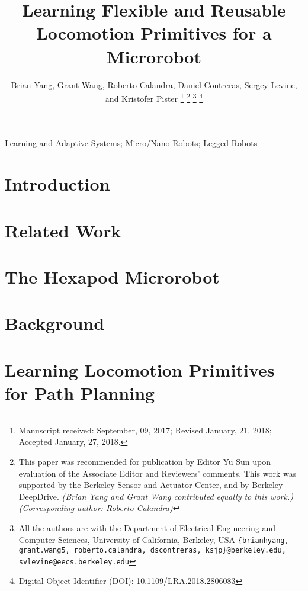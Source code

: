 \documentclass[letterpaper, 10 pt, journal, twoside]{IEEEtran}
\title{Learning Flexible and Reusable Locomotion Primitives for a Microrobot}
\author{Brian Yang, Grant Wang, Roberto Calandra, Daniel Contreras, Sergey Levine, and Kristofer Pister%
\thanks{Manuscript received: September, 09, 2017; Revised January, 21, 2018; Accepted January, 27, 2018.}%
\thanks{This paper was recommended for publication by Editor Yu Sun upon evaluation of the Associate Editor and Reviewers' comments. 
This work was supported by the Berkeley Sensor and Actuator Center, and by Berkeley DeepDrive. \textit{(Brian Yang and Grant Wang contributed equally to this work.) (Corresponding author: \href{mailto:roberto.calandra@berkeley.edu}{Roberto Calandra})}}
\thanks{All the authors are with the Department of Electrical Engineering and Computer Sciences, University of California, Berkeley, USA
        {\tt\small \{brianhyang, grant.wang5, roberto.calandra, dscontreras, ksjp\}@berkeley.edu, svlevine@eecs.berkeley.edu}}%
\thanks{Digital Object Identifier (DOI): 10.1109/LRA.2018.2806083}
}
\begin{document}
\maketitle


\begin{abstract}
	
\end{abstract}
\begin{IEEEkeywords}
Learning and Adaptive Systems; Micro/Nano Robots; Legged Robots
\end{IEEEkeywords}


\section{Introduction}

	


\section{Related Work}
\label{sec:related}

	


\section{The Hexapod Microrobot}
	
    


\section{Background}
\label{sec:background}

	
	

\section{Learning Locomotion Primitives for Path Planning}
\label{sec:approach}
\end{document}
